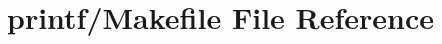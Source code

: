\hypertarget{printf_2Makefile}{\section{printf/\-Makefile File Reference}
\label{printf_2Makefile}
}
